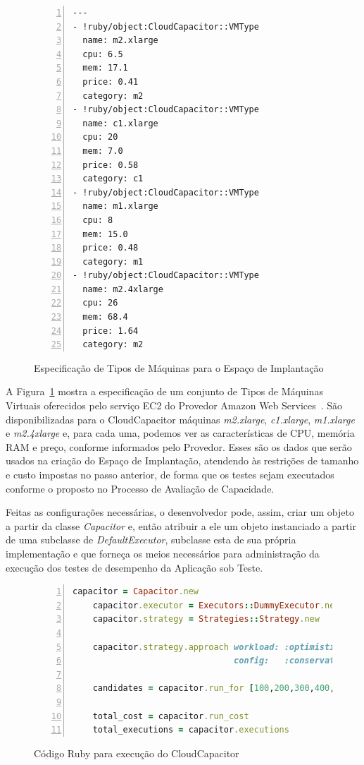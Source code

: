 \begin{figure}[h]
  \caption{\label{fig:depspace}Especificação de Tipos de Máquinas para o Espaço de Implantação}
 \begin{lstlisting}[linewidth=\textwidth,xleftmargin=.04\textwidth, numbers=left]
---
- !ruby/object:CloudCapacitor::VMType
  name: m2.xlarge
  cpu: 6.5
  mem: 17.1
  price: 0.41
  category: m2
- !ruby/object:CloudCapacitor::VMType
  name: c1.xlarge
  cpu: 20
  mem: 7.0
  price: 0.58
  category: c1
- !ruby/object:CloudCapacitor::VMType
  name: m1.xlarge
  cpu: 8
  mem: 15.0
  price: 0.48
  category: m1
- !ruby/object:CloudCapacitor::VMType
  name: m2.4xlarge
  cpu: 26
  mem: 68.4
  price: 1.64
  category: m2
  \end{lstlisting}
\end{figure}

A Figura~\ref{fig:depspace} mostra a especificação de um conjunto de Tipos de
Máquinas Virtuais oferecidos pelo serviço EC2 do Provedor Amazon Web 
Services~\cite{ec2}. São disponibilizadas para o CloudCapacitor máquinas 
\emph{m2.xlarge}, \emph{c1.xlarge}, \emph{m1.xlarge} e \emph{m2.4xlarge} e, para
cada uma, podemos ver as características de CPU, memória RAM e preço, conforme
informados pelo Provedor. Esses são os dados que serão usados na criação do Espaço
de Implantação, atendendo às restrições de tamanho e custo impostas no passo 
anterior, de forma que os testes sejam executados conforme o proposto
no Processo de Avaliação de Capacidade.

Feitas as configurações necessárias, o desenvolvedor pode, assim, criar um objeto 
a partir da classe \emph{Capacitor} e, então atribuir a ele um objeto instanciado
a partir de uma subclasse de \emph{DefaultExecutor}, subclasse esta de sua própria
implementação e que forneça os meios necessários para administração da execução
dos testes de desempenho da Aplicação sob Teste.

\begin{figure}[h]
  \caption{\label{fig:mincode}Código Ruby para execução do CloudCapacitor}
 \begin{lstlisting}[language=Ruby,linewidth=\textwidth,xleftmargin=.04\textwidth, numbers=left]
    capacitor = Capacitor.new
    capacitor.executor = Executors::DummyExecutor.new
    capacitor.strategy = Strategies::Strategy.new

    capacitor.strategy.approach workload: :optimistic,
                                config:   :conservative

    candidates = capacitor.run_for [100,200,300,400,500]
    
    total_cost = capacitor.run_cost
    total_executions = capacitor.executions  
 \end{lstlisting}
\end{figure}

